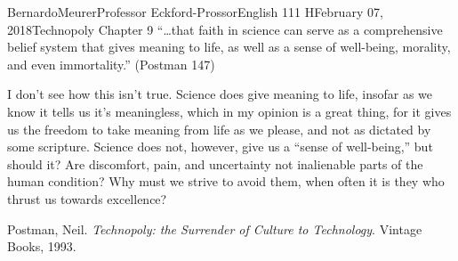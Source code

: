 \documentclass[12pt,letterpaper]{article}
\begin{document}
\begin{mla}{Bernardo}{Meurer}{Professor Eckford-Prossor}{English 111 H}{February 07, 2018}{Technopoly Chapter 9}
    ``\ldots that faith in science can serve as a comprehensive belief system that gives meaning to life, as well as a sense of well-being, morality, and even immortality.'' (Postman 147)
    \vspace{10pt}

    I don't see how this isn't true. Science does give meaning to life, insofar as we know it tells us it's meaningless, which in my opinion is a great thing, for it gives us the freedom to take meaning from life as we please, and not as dictated by some scripture. Science does not, however, give us a ``sense of well-being,'' but should it? Are discomfort, pain, and uncertainty not inalienable parts of the human condition? Why must we strive to avoid them, when often it is they who thrust us towards excellence?
    \begin{workscited}
        \bibent  Postman, Neil. \emph{Technopoly: the Surrender of Culture to Technology}. Vintage Books, 1993.
    \end{workscited}
\end{mla}
\end{document}
